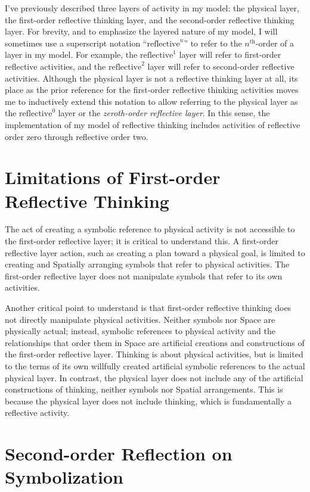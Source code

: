 I've previously described three layers of activity in my model: the
physical layer, the first-order reflective thinking layer, and the
second-order reflective thinking layer.  For brevity, and to emphasize
the layered nature of my model, I will sometimes use a superscript
notation ``$\text{reflective}^n$'' to refer to the $n^\text{th}$-order
of a layer in my model.  For example, the $\text{reflective}^1$ layer
will refer to first-order reflective activities, and the
$\text{reflective}^2$ layer will refer to second-order reflective
activities.  Although the physical layer is not a reflective thinking
layer at all, its place as the prior reference for the first-order
reflective thinking activities moves me to inductively extend this
notation to allow referring to the physical layer as the
$\text{reflective}^0$ layer or the \emph{zeroth-order reflective
  layer}.  In this sense, the implementation of my model of reflective
thinking includes activities of reflective order zero through
reflective order two.

\section{Limitations of First-order Reflective Thinking}

The act of creating a symbolic reference to physical activity is not
accessible to the first-order reflective layer; it is critical to
understand this.  A first-order reflective layer action, such as
creating a plan toward a physical goal, is limited to creating and
Spatially arranging symbols that refer to physical activities.  The
first-order reflective layer does not manipulate symbols that refer to
its own activities.

Another critical point to understand is that first-order reflective
thinking does not directly manipulate physical activities.  Neither
symbols nor Space are physically actual; instead, symbolic references
to physical activity and the relationships that order them in Space
are artificial creations and constructions of the first-order
reflective layer.  Thinking is about physical activities, but is
limited to the terms of its own willfully created artificial symbolic
references to the actual physical layer.  In contrast, the physical
layer does not include any of the artificial constructions of
thinking, neither symbols nor Spatial arrangements.  This is because
the physical layer does not include thinking, which is fundamentally a
reflective activity.

\section{Second-order Reflection on Symbolization}

